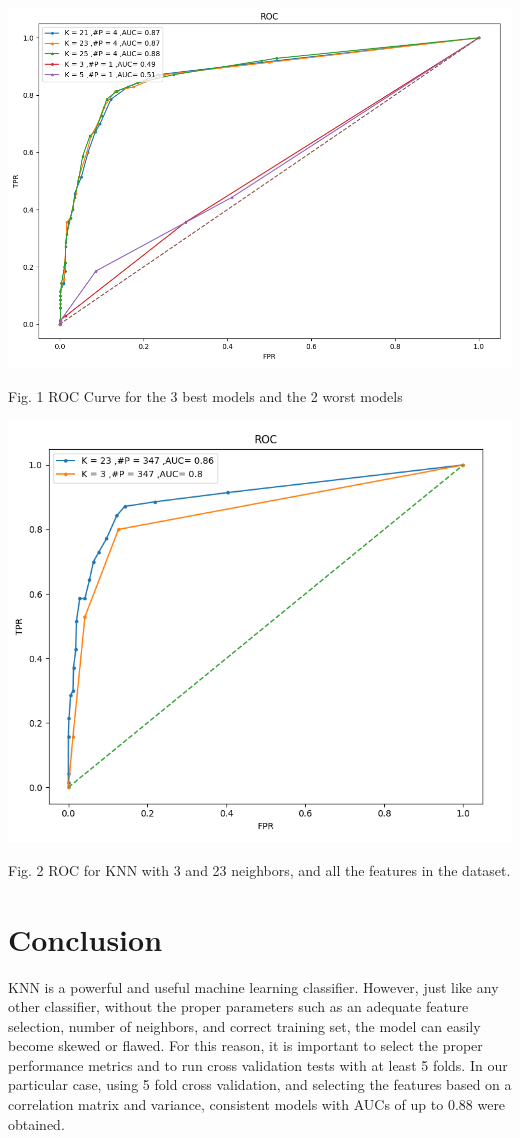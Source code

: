 \documentclass{article}
\begin{document}
\begin{center}
\includegraphics[scale=.2]{ROCNew.png} %
\end{center}
Fig. 1 ROC Curve for the 3 best models and the 2 worst models\\

\begin{center}
\includegraphics[scale=.25]{ROC_allfeatures.png}
\end{center}
Fig. 2 ROC for KNN with 3 and 23 neighbors, and all the features in the dataset.


\section{Conclusion}
KNN is a powerful and useful machine learning classifier. However, just like any other classifier, without the proper parameters such as an adequate feature selection, number of neighbors, and correct training set, the model can easily become skewed or flawed. For this reason, it is important to select the proper performance metrics and to run cross validation tests with at least 5 folds. In our particular case, using 5 fold cross validation, and selecting the features based on a correlation matrix and variance, consistent models with AUCs of up to 0.88 were obtained.   \\ 
\end{document}
